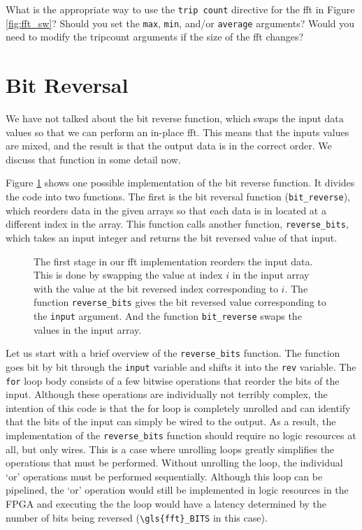 \begin{exercise}
What is the appropriate way to use the \lstinline|trip count| directive for the \gls{fft} in Figure \ref{fig:fft_sw}? Should you set the \lstinline|max|, \lstinline|min|, and/or \lstinline|average| arguments? Would you need to modify the tripcount arguments if the size of the \gls{fft} changes?  
\end{exercise}

\section{Bit Reversal}
\label{sec:fft_bit_reversal}

We have not talked about the bit reverse function, which swaps the input data values so that we can perform an in-place \gls{fft}. This means that the inputs values are mixed, and the result is that the output data is in the correct order. We discuss that function in some detail now.

Figure \ref{fig:fft_bit_reverse} shows one possible implementation of the bit reverse function. It divides the code into two functions. The first is the bit reversal function (\lstinline|bit_reverse|), which reorders data in the given arrays so that each data is in located at a different index in the array. This function calls another function, \lstinline|reverse_bits|, which takes an input integer and returns the bit reversed value of that input.

\begin{figure}

\caption{ The first stage in our \gls{fft} implementation reorders the input data. This is done by swapping the value at index $i$ in the input array with the value at the bit reversed index corresponding to $i$. The function \lstinline|reverse_bits| gives the bit reversed value corresponding to the \lstinline|input| argument. And the function \lstinline|bit_reverse| swaps the values in the input array. }
\label{fig:fft_bit_reverse}
\end{figure}

Let us start with a brief overview of the \lstinline|reverse_bits| function. The function goes bit by bit through the \lstinline|input| variable and shifts it into the \lstinline|rev| variable. The \lstinline|for| loop body consists of a few bitwise operations that reorder the bits of the input. Although these operations are individually not terribly complex, the intention of this code is that the for loop is completely unrolled and \VHLS can identify that the bits of the input can simply be wired to the output.  As a result, the implementation of the \lstinline|reverse_bits| function should require no logic resources at all, but only wires.  This is a case where unrolling loops greatly simplifies the operations that must be performed.  Without unrolling the loop, the individual `or' operations must be performed sequentially.  Although this loop can be pipelined, the `or' operation would still be implemented in logic resources in the FPGA and executing the the loop would have a latency determined by the number of bits being reversed (\lstinline|\gls{fft}_BITS| in this case).

